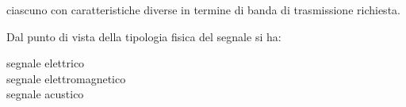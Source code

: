 ciascuno con caratteristiche diverse in termine di banda di trasmissione richiesta.

Dal punto di vista della tipologia fisica del segnale si ha:

\begin{description}
\item[segnale elettrico]
\item[segnale elettromagnetico]
\item[segnale acustico]
\end{description}

%

\clearpage
